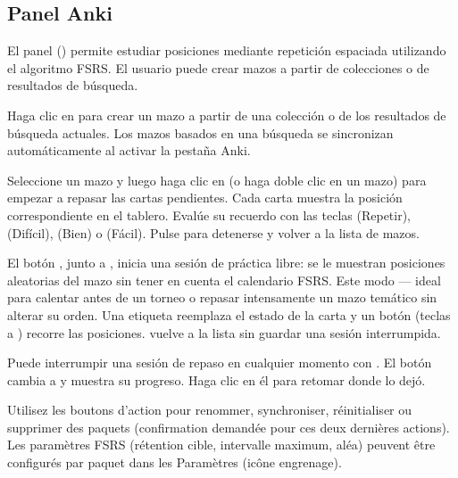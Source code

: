 \documentclass[letterpaper,10pt,spanish]{sphinxmanual}
\begin{document}
\subsection{Panel Anki}
\label{\detokenize{manuel:panneau-anki}}\label{\detokenize{manuel:id10}}
\sphinxAtStartPar
El panel  () permite estudiar posiciones mediante repetición espaciada utilizando el algoritmo FSRS. El usuario puede crear mazos a partir de colecciones o de resultados de búsqueda.

\sphinxAtStartPar
{} Haga clic en  para crear un mazo a partir de una colección o de los resultados de búsqueda actuales. Los mazos basados en una búsqueda se sincronizan automáticamente al activar la pestaña Anki.

\sphinxAtStartPar
{} Seleccione un mazo y luego haga clic en  (o haga doble clic en un mazo) para empezar a repasar las cartas pendientes. Cada carta muestra la posición correspondiente en el tablero. Evalúe su recuerdo con las teclas  (Repetir),  (Difícil),  (Bien) o  (Fácil). Pulse  para detenerse y volver a la lista de mazos.

\sphinxAtStartPar
{} El botón , junto a , inicia una sesión de práctica libre: se le muestran posiciones aleatorias del mazo sin tener en cuenta el calendario FSRS. Este modo  — ideal para calentar antes de un torneo o repasar intensamente un mazo temático sin alterar su orden. Una etiqueta  reemplaza el estado de la carta y un botón  (teclas  a ) recorre las posiciones.  vuelve a la lista sin guardar una sesión interrumpida.

\sphinxAtStartPar
{} Puede interrumpir una sesión de repaso en cualquier momento con . El botón cambia a  y muestra su progreso. Haga clic en él para retomar donde lo dejó.

\sphinxAtStartPar
{} Utilisez les boutons d’action pour renommer,
synchroniser, réinitialiser ou supprimer des paquets (confirmation demandée
pour ces deux dernières actions). Les paramètres FSRS (rétention cible,
intervalle maximum, aléa) peuvent être configurés par paquet dans les
Paramètres (icône engrenage).
\end{document}
